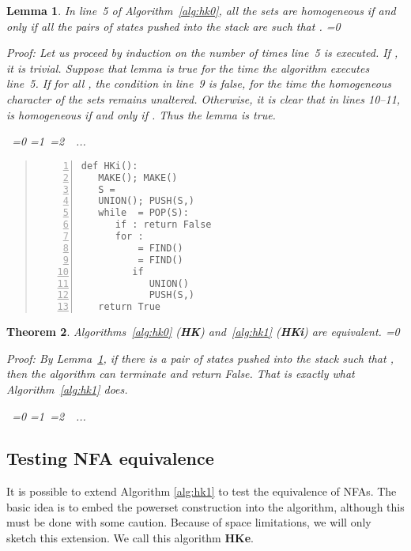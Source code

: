 \documentclass[copyright]{eptcs}
\makeatletter
\newtheorem{theorem}{Theorem}
\newtheorem{lemma}[theorem]{Lemma}
\newcounter{d@proof}\let\thed@proof\relax\setcounter{d@proof}{0}
\newcommand*{\qed}{}
\newenvironment{proof}{\ifnum \value{d@proof}=0{\setcounter{claim}{0}}\else\fi
  \stepcounter{d@proof}\par\noindent
  {\rmfamily\itshape\mdseries Proof\/}:\hspace{\labelsep}\ignorespaces}{\addtocounter{d@proof}{-1}\mbox{}\nolinebreak\hfill~\ifnum \value{d@proof}=0{\qed}\else
    \ifnum \value{d@proof}=1{\qed\nolinebreak\,\nolinebreak\qed}\else
      \ifnum \value{d@proof}=2{\qed\nolinebreak\,\nolinebreak\qed
          \nolinebreak\,\nolinebreak\qed}\else
        {\qed\nolinebreak...\nolinebreak\qed}\fi\fi\fi
  \medbreak
}
\newcommand{\nfa}{NFA\xspace}
\newcommand{\nfas}{NFAs\xspace}
\newcommand{\hk}{\textbf{HK}\xspace}
\newcommand{\hki}{\textbf{HKi}\xspace}
\newcommand{\hke}{\textbf{HKe}\xspace}
\makeatother
\begin{document}
\begin{lemma}
\label{lem:refutation_is_ok} 
In line~5 of Algorithm~\ref{alg:hk0}, all the sets  are
homogeneous if and only if all the pairs of states  pushed
into the stack are such that .
\begin{proof}
  \emph{
  Let us proceed by induction on the number  of times line~5 is
  executed. If , it is trivial. Suppose that lemma is true for
  the  time the algorithm executes line~5. If for all , the condition in line~9 is false, for the  time
  the homogeneous character of the sets remains unaltered. Otherwise,
  it is clear that in lines 10--11,  is homogeneous
  if and only if . Thus the lemma is true.}
\end{proof}

\end{lemma}
\begin{quote}
\begin{lstlisting}[caption={\hk{} algorithm with an early refutation step~(\hki).},captionpos=b,numbers=left,label=alg:hk1]
def HKi():
   MAKE(); MAKE()
   S = 
   UNION(); PUSH(S,)
   while  = POP(S):
      if : return False
      for :
          = FIND()
          = FIND()
         if 
            UNION()
            PUSH(S,)
   return True
\end{lstlisting}
\end{quote}

\begin{theorem}
  \label{th:refutation_is_ok}
  Algorithms~\ref{alg:hk0} (\hk) and~\ref{alg:hk1} (\hki) are
  equivalent.
  \begin{proof}
  \emph{
      By Lemma~\ref{lem:refutation_is_ok}, if there is a pair of
      states  pushed into the stack such that , then the algorithm can terminate and return
      \emph{False}. That is exactly what Algorithm~\ref{alg:hk1}
      does.}
  \end{proof}
\end{theorem}















\subsection{Testing \nfa equivalence}
\label{sec:nfa}

It is possible to extend Algorithm \ref{alg:hk1} to test the
equivalence of \nfas. The basic idea is to embed the powerset
construction into the algorithm, although this must be done with some
caution. 
Because of space limitations, we will only sketch this extension. 
We call this algorithm \hke.
\end{document}
